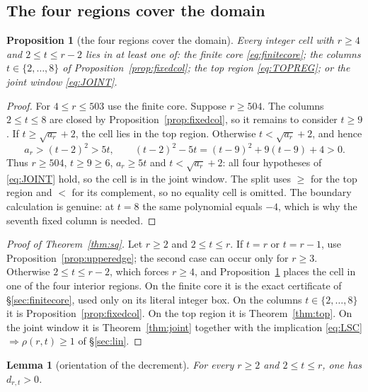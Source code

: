 \documentclass[11pt,a4paper]{article}
\theoremstyle{plain}
\newtheorem{proposition}[theorem]{Proposition}
\newtheorem{lemma}[theorem]{Lemma}
\theoremstyle{definition}
\theoremstyle{remark}
\begin{document}
\subsection{The four regions cover the domain}

\begin{proposition}[the four regions cover the domain]\label{prop:coverage}
Every integer cell with $r\ge4$ and $2\le t\le r-2$ lies in at least one of:
the finite core \eqref{eq:finitecore}; the columns $t\in\{2,\dots,8\}$ of
Proposition~\ref{prop:fixedcol}; the top region \eqref{eq:TOPREG}; or the joint
window \eqref{eq:JOINT}.
\end{proposition}

\begin{proof}
For $4\le r\le503$ use the finite core. Suppose $r\ge504$. The columns
$2\le t\le8$ are closed by Proposition~\ref{prop:fixedcol}, so it remains to
consider $t\ge9$. If $t\ge\sqrt{a_r}+2$, the cell lies in the top region.
Otherwise $t<\sqrt{a_r}+2$, and hence
\[
 a_r>(t-2)^2>5t,
 \qquad
 (t-2)^2-5t=(t-9)^2+9(t-9)+4>0.
\]
Thus $r\ge504$, $t\ge9\ge6$, $a_r\ge5t$ and
$t<\sqrt{a_r}+2$: all four hypotheses of \eqref{eq:JOINT} hold, so the cell is
in the joint window. The split uses $\ge$ for the top region and $<$ for its
complement, so no equality cell is omitted. The boundary calculation is
genuine: at $t=8$ the same polynomial equals $-4$, which is why the seventh
fixed column is needed.
\end{proof}

\begin{proof}[Proof of Theorem~\ref{thm:sq}]
Let $r\ge2$ and $2\le t\le r$. If $t=r$ or $t=r-1$, use
Proposition~\ref{prop:upperedge}; the second case can occur only for $r\ge3$.
Otherwise $2\le t\le r-2$, which forces $r\ge4$, and
Proposition~\ref{prop:coverage} places the cell in one of the four interior
regions. On the finite core it is the exact certificate of
\S\ref{sec:finitecore}, used only on its literal integer box. On the columns
$t\in\{2,\dots,8\}$ it is Proposition~\ref{prop:fixedcol}. On the top region it
is Theorem~\ref{thm:top}. On the joint window it is
Theorem~\ref{thm:joint} together with the implication
\eqref{eq:LSC}$\Rightarrow\rho(r,t)\ge1$ of \S\ref{sec:lin}.
\end{proof}

\begin{lemma}[orientation of the decrement]\label{lem:dpositive}
For every $r\ge2$ and $2\le t\le r$, one has $d_{r,t}>0$.
\end{lemma}
\end{document}
